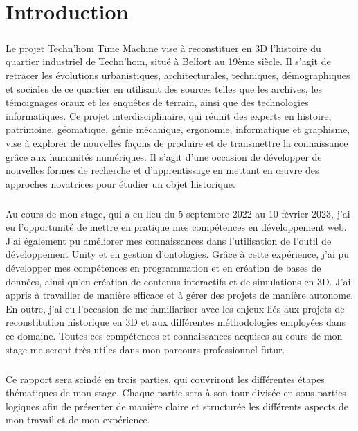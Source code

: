 \chapter*{Introduction}

\paragraph{} 
\hspace{10mm} Le projet Techn'hom Time Machine vise à reconstituer en 3D l'histoire du quartier industriel de Techn'hom, situé à Belfort au 19ème siècle. Il s'agit de retracer les évolutions urbanistiques, architecturales, techniques, démographiques et sociales de ce quartier en utilisant des sources telles que les archives, les témoignages oraux et les enquêtes de terrain, ainsi que des technologies informatiques. Ce projet interdisciplinaire, qui réunit des experts en histoire, patrimoine, géomatique, génie mécanique, ergonomie, informatique et graphisme, vise à explorer de nouvelles façons de produire et de transmettre la connaissance grâce aux humanités numériques. Il s'agit d'une occasion de développer de nouvelles formes de recherche et d'apprentissage en mettant en œuvre des approches novatrices pour étudier un objet historique.

\paragraph{}
\hspace{10mm} Au cours de mon stage, qui a eu lieu du 5 septembre 2022 au 10 février 2023, j'ai eu l'opportunité de mettre en pratique mes compétences en développement web. J'ai également pu améliorer mes connaissances dans l'utilisation de l'outil de développement Unity et en gestion d'ontologies. Grâce à cette expérience, j'ai pu développer mes compétences en programmation et en création de bases de données, ainsi qu'en création de contenus interactifs et de simulations en 3D. J'ai appris à travailler de manière efficace et à gérer des projets de manière autonome. En outre, j'ai eu l'occasion de me familiariser avec les enjeux liés aux projets de reconstitution historique en 3D et aux différentes méthodologies employées dans ce domaine. Toutes ces compétences et connaissances acquises au cours de mon stage me seront très utiles dans mon parcours professionnel futur.

\paragraph{}
\hspace{10mm} Ce rapport sera scindé en trois parties, qui couvriront les différentes étapes thématiques de mon stage. Chaque partie sera à son tour divisée en sous-parties logiques afin de présenter de manière claire et structurée les différents aspects de mon travail et de mon expérience.